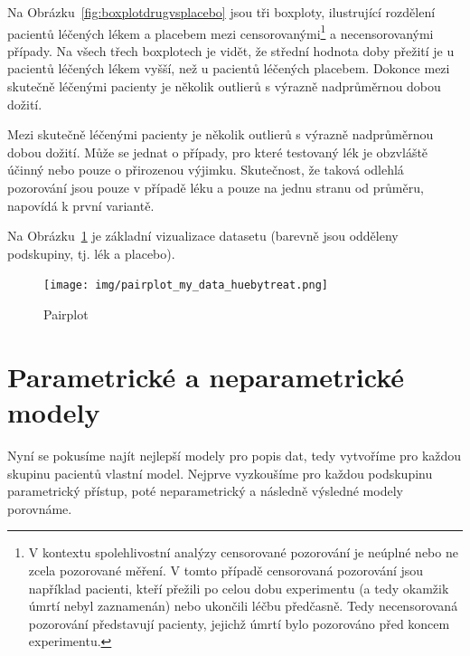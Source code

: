 \documentclass[a4, 11pt]{article}
\newcommand{\commm}[1]{{\textcolor[cmyk]{0,1,0,0}{\textbf{\textsf{#1}}}}}      %
\theoremstyle{definition}
\theoremstyle{remark}
\begin{document}
	Na Obrázku~\ref{fig:boxplotdrugvsplacebo} jsou tři boxploty, ilustrující rozdělení pacientů léčených lékem a placebem mezi censorovanými\footnote{V kontextu spolehlivostní analýzy censorované pozorování je neúplné nebo ne zcela pozorované měření. V tomto případě censorovaná pozorování jsou například pacienti, kteří přežili po celou dobu experimentu (a tedy okamžik úmrtí nebyl zaznamenán) nebo ukončili léčbu předčasně. Tedy necensorovaná pozorování představují pacienty, jejichž úmrtí bylo pozorováno před koncem experimentu.} a necensorovanými případy. 
	Na všech třech boxplotech je vidět, že střední hodnota doby přežití je u pacientů léčených lékem vyšší, než u pacientů léčených placebem. Dokonce mezi skutečně léčenými pacienty je několik outlierů s výrazně nadprůměrnou dobou dožití.
	 
	Mezi skutečně léčenými pacienty je několik outlierů s výrazně nadprůměrnou dobou dožití. Může se jednat o případy, pro které testovaný lék je obzvláště účinný nebo pouze o přirozenou výjimku. Skutečnost, že taková odlehlá pozorování jsou pouze v případě léku a pouze na jednu stranu od průměru, napovídá k první variantě.
	
%
	
	Na Obrázku~\ref{fig:pairplot_my_data} je základní vizualizace datasetu (barevně jsou odděleny podskupiny, tj. lék a placebo).
	
	\begin{figure}%
		\centering
		\texttt{[image: img/pairplot\_my\_data\_huebytreat.png]}
		\caption{Pairplot}
		\label{fig:pairplot_my_data}
	\end{figure}
	


	\section{Parametrické a neparametrické modely}
	Nyní se pokusíme najít nejlepší modely pro popis dat, tedy vytvoříme pro každou skupinu pacientů vlastní model. Nejprve vyzkoušíme pro každou podskupinu parametrický přístup, poté neparametrický a následně výsledné modely porovnáme.
	
\end{document}
